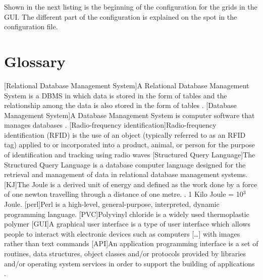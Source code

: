 \documentclass[a4paper,10pt,twoside,headings=small,bibliography=totocnumbered,headsepline]{scrartcl}
\begin{document}
\begin{appendix}
Shown in the next listing is the beginning of the configuration for the grids in the GUI. The different part of the configuration is explained on the spot in the configuration file.



\newpage

\section{Glossary}
\begin{acronym}
[Relational Database Management System]{A Relational Database Management System is a \acs{DBMS} in which data is stored in the form of tables and the relationship among the data is also stored in the form of tables \cite{wiki:rdbms}.}
[Database Management System]{A Database Management System is computer software that manages databases \cite{wiki:dbms}.}
[Radio-frequency identification]{Radio-frequency identification (RFID) is the use of an object (typically referred to as an RFID tag) applied to or incorporated into a product, animal, or person for the purpose of identification and tracking using radio waves \cite{wiki:rfid} }
[Structured Query Language]{The Structured Query Language is a database computer language designed for the retrieval and management of data in relational database management systems.\cite{wiki:sql}}
[KJ]{The Joule is a derived unit of energy and defined as the work done by a force of one newton travelling through a distance of one metre. \cite{wiki:joule}. 1 Kilo Joule = 10$^3$ Joule.}
[perl]{Perl is a high-level, general-purpose, interpreted, dynamic programming language. \cite{wiki:perl}}
[PVC]{Polyvinyl chloride is a widely used thermoplastic polymer \cite{wiki:pvc}}
[GUI]{A graphical user interface is a type of user interface which allows people to interact with electronic devices such as computers [\ldots] with images rather than text commands \cite{wiki:gui}}
[API]{An application programming interface is a set of routines, data structures, object classes and/or protocols provided by libraries and/or operating system services in order to support the building of applications \cite{wiki:api}.}

\end{acronym}
\end{appendix}
\end{document}
